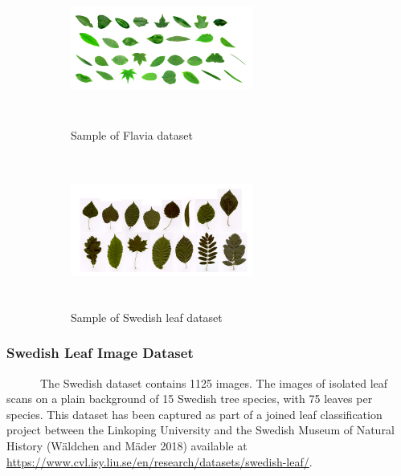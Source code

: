 \documentclass{article}
\begin{document}
\begin{figure}[!ht]
\begin{subfigure}{.5\textwidth}
\centering
        \includegraphics[width=60mm, height=50mm]{./Figures/flavia_images.png}
        \caption{\label{slp1}Sample of Flavia dataset}
        
\end{subfigure} 
\begin{subfigure}{.5\textwidth}
\centering
        \includegraphics[width=60mm, height=50mm]{./Figures/swedish_data.png}
        \caption{\label{slp2}Sample of Swedish leaf dataset}
        
\end{subfigure} 

\caption{}
        \end{figure}

\hypertarget{swedish-leaf-image-dataset}{%
\subsubsection{Swedish Leaf Image
Dataset}\label{swedish-leaf-image-dataset}}

~~~~~~The Swedish dataset contains 1125 images. The images of isolated
leaf scans on a plain background of 15 Swedish tree species, with 75
leaves per species. This dataset has been captured as part of a joined
leaf classification project between the Linkoping University and the
Swedish Museum of Natural History (Wäldchen and Mäder 2018) available at
\url{https://www.cvl.isy.liu.se/en/research/datasets/swedish-leaf/}.
\end{document}
